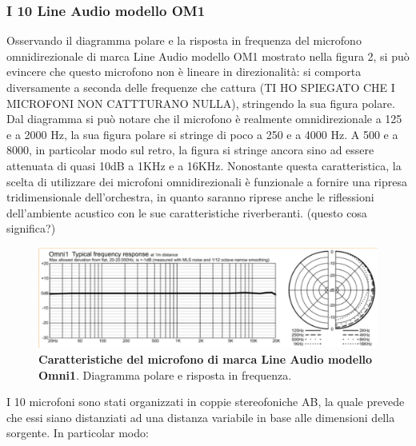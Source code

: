 \subsubsection{I 10 Line Audio modello OM1}
Osservando il diagramma polare e la risposta in frequenza del microfono omnidirezionale di marca Line Audio modello OM1 mostrato nella figura 2, si può evincere che questo microfono non è lineare in direzionalità: si comporta diversamente a seconda delle frequenze che cattura (TI HO SPIEGATO CHE I MICROFONI NON CATTTURANO NULLA), stringendo la sua figura polare. Dal diagramma si può notare che il microfono è realmente omnidirezionale a 125 e a 2000 Hz, la sua figura polare si stringe di poco a 250 e a 4000 Hz. A 500 e a 8000, in particolar modo sul retro, la figura si stringe ancora sino ad essere attenuata di quasi 10dB a 1KHz e a 16KHz.
Nonostante questa caratteristica, la scelta di utilizzare dei microfoni omnidirezionali è funzionale a fornire una ripresa tridimensionale dell'orchestra, in quanto saranno riprese anche le riflessioni dell'ambiente acustico con le sue caratteristiche riverberanti.
(questo cosa significa?)

\begin{figure}[b]
	\begin{center}
		\includegraphics[width=.47\textwidth]{img/image1.png}
		\caption{\textbf{Caratteristiche del microfono di marca Line Audio modello Omni1}. Diagramma polare e risposta in frequenza.}
		\label{gr01}
	\end{center}
\end{figure}

I 10 microfoni sono stati organizzati in coppie stereofoniche AB, la quale prevede che essi siano distanziati ad una distanza variabile in base alle dimensioni della sorgente. In particolar modo:

